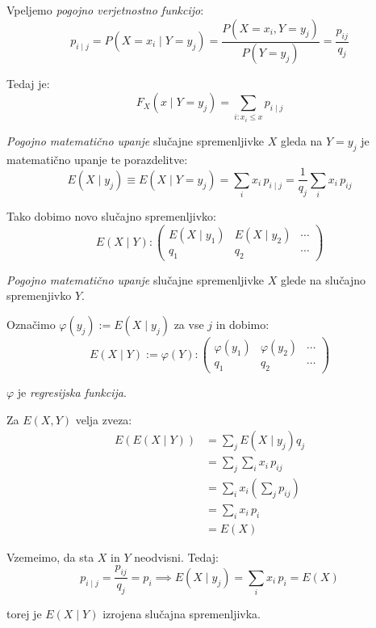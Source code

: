 \documentclass[12pt]{book}
\def\n{\noindent}
\theoremstyle{definition}
\theoremstyle{plain}
\theoremstyle{plain}
\theoremstyle{plain}
\theoremstyle{remark}
\begin{document}
\n Vpeljemo \emph{pogojno verjetnostno funkcijo}:
$$
p_{i \mid j}=P\left(X=x_i \mid Y=y_j\right)=\frac{P\left(X=x_i, Y=y_j\right)}{P\left(Y=y_j\right)}=\frac{p_{i j}}{q_j}
$$

Tedaj je:
$$
F_X\left(x \mid Y=y_j\right)=\sum_{i: x_i \leq x} p_{i \mid j}
$$

\n \emph{Pogojno matematično upanje} slučajne spremenljivke $X$ gleda na $Y=y_j$ je matematično upanje te porazdelitve: 
$$
E\left(X \mid y_j\right) \equiv E\left(X \mid Y=y_j\right)=\sum_i x_i \, p_{i \mid j}=\frac{1}{q_j} \sum_i x_i \, p_{i j}
$$

Tako dobimo novo slučajno spremenljivko: 
$$
E(X \mid Y):\left(\begin{array}{ccc}
    E\left(X \mid y_1\right) & E\left(X \mid y_2\right) & \cdots \\
    q_1 & q_2 & \cdots
    \end{array}\right)
$$

\emph{Pogojno matematično upanje} slučajne spremenljivke $X$ glede na slučajno spremenjivko $Y$. 

\n Označimo $\varphi\left(y_j\right):=E\left(X \mid y_j\right)$ za vse $j$ in dobimo: 
$$
E(X \mid Y):=\varphi(Y):\left(\begin{array}{ccc}
    \varphi\left(y_1\right) & \varphi\left(y_2\right) & \cdots \\
    q_1 & q_2 & \cdots 
    \end{array}\right)
$$

$\varphi$ je \emph{regresijska funkcija}. 

\n Za $E(X,Y)$ velja zveza: 
$$
\begin{aligned}
    E(E(X \mid Y))&=\sum_j E\left(X \mid y_j\right) q_j \\
    &=\sum_j \sum_i x_i \, p_{i j} \\
    &=\sum_i x_i\left(\sum_j p_{i j}\right) \\
    &=\sum_i x_i \, p_i \\
    &=E(X)
\end{aligned}
$$

\n Vzemeimo, da sta $X$ in $Y$ neodvisni. Tedaj: 
$$
p_{i \mid j}=\frac{p_{i j}}{q_j}=p_i \implies E\left(X \mid y_j\right)=\sum_i x_i\, p_i=E(X)
$$

torej je $E(X \mid Y)$ izrojena slučajna spremenljivka.
\end{document}
